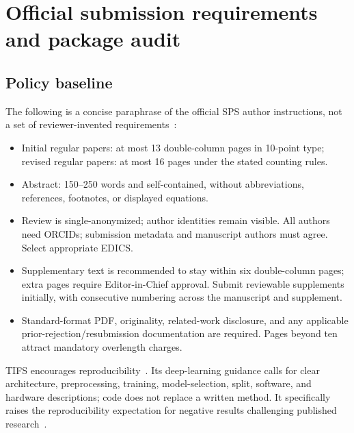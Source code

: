 \documentclass[11pt,a4paper]{article}
\begin{document}
\section{Official submission requirements and package audit}

\subsection{Policy baseline}
The following is a concise paraphrase of the official SPS author instructions, not a set of reviewer-invented requirements~\cite{spsauthors}:
\begin{itemize}
\item Initial regular papers: at most 13 double-column pages in 10-point type; revised regular papers: at most 16 pages under the stated counting rules.
\item Abstract: 150--250 words and self-contained, without abbreviations, references, footnotes, or displayed equations.
\item Review is single-anonymized; author identities remain visible. All authors need ORCIDs; submission metadata and manuscript authors must agree. Select appropriate EDICS.
\item Supplementary text is recommended to stay within six double-column pages; extra pages require Editor-in-Chief approval. Submit reviewable supplements initially, with consecutive numbering across the manuscript and supplement.
\item Standard-format PDF, originality, related-work disclosure, and any applicable prior-rejection/resubmission documentation are required. Pages beyond ten attract mandatory overlength charges.
\end{itemize}

TIFS encourages reproducibility~\cite{tifsscope}. Its deep-learning guidance calls for clear architecture, preprocessing, training, model-selection, split, software, and hardware descriptions; code does not replace a written method. It specifically raises the reproducibility expectation for negative results challenging published research~\cite{tifsdl}.
\end{document}
